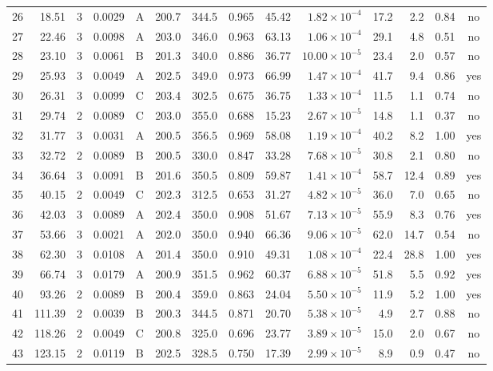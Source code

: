 \begin{landscape}
\begin{longtable}{rrrrlrrrrrrrrc}
26 & 18.51 & 3 & 0.0029 & A & 200.7 & 344.5 & 0.965 & 45.42 & $1.82\times10^{-4}$ & 17.2 & 2.2 & 0.84 & no \\
27 & 22.46 & 3 & 0.0098 & A & 203.0 & 346.0 & 0.963 & 63.13 & $1.06\times10^{-4}$ & 29.1 & 4.8 & 0.51 & no \\
28 & 23.10 & 3 & 0.0061 & B & 201.3 & 340.0 & 0.886 & 36.77 & $10.00\times10^{-5}$ & 23.4 & 2.0 & 0.57 & no \\
29 & 25.93 & 3 & 0.0049 & A & 202.5 & 349.0 & 0.973 & 66.99 & $1.47\times10^{-4}$ & 41.7 & 9.4 & 0.86 & yes \\
30 & 26.31 & 3 & 0.0099 & C & 203.4 & 302.5 & 0.675 & 36.75 & $1.33\times10^{-4}$ & 11.5 & 1.1 & 0.74 & no \\
31 & 29.74 & 2 & 0.0089 & C & 203.0 & 355.0 & 0.688 & 15.23 & $2.67\times10^{-5}$ & 14.8 & 1.1 & 0.37 & no \\
32 & 31.77 & 3 & 0.0031 & A & 200.5 & 356.5 & 0.969 & 58.08 & $1.19\times10^{-4}$ & 40.2 & 8.2 & 1.00 & yes \\
33 & 32.72 & 2 & 0.0089 & B & 200.5 & 330.0 & 0.847 & 33.28 & $7.68\times10^{-5}$ & 30.8 & 2.1 & 0.80 & no \\
34 & 36.64 & 3 & 0.0091 & B & 201.6 & 350.5 & 0.809 & 59.87 & $1.41\times10^{-4}$ & 58.7 & 12.4 & 0.89 & yes \\
35 & 40.15 & 2 & 0.0049 & C & 202.3 & 312.5 & 0.653 & 31.27 & $4.82\times10^{-5}$ & 36.0 & 7.0 & 0.65 & no \\
36 & 42.03 & 3 & 0.0089 & A & 202.4 & 350.0 & 0.908 & 51.67 & $7.13\times10^{-5}$ & 55.9 & 8.3 & 0.76 & yes \\
37 & 53.66 & 3 & 0.0021 & A & 202.0 & 350.0 & 0.940 & 66.36 & $9.06\times10^{-5}$ & 62.0 & 14.7 & 0.54 & no \\
38 & 62.30 & 3 & 0.0108 & A & 201.4 & 350.0 & 0.910 & 49.31 & $1.08\times10^{-4}$ & 22.4 & 28.8 & 1.00 & yes \\
39 & 66.74 & 3 & 0.0179 & A & 200.9 & 351.5 & 0.962 & 60.37 & $6.88\times10^{-5}$ & 51.8 & 5.5 & 0.92 & yes \\
40 & 93.26 & 2 & 0.0089 & B & 200.4 & 359.0 & 0.863 & 24.04 & $5.50\times10^{-5}$ & 11.9 & 5.2 & 1.00 & yes \\
41 & 111.39 & 2 & 0.0039 & B & 200.3 & 344.5 & 0.871 & 20.70 & $5.38\times10^{-5}$ & 4.9 & 2.7 & 0.88 & no \\
42 & 118.26 & 2 & 0.0049 & C & 200.8 & 325.0 & 0.696 & 23.77 & $3.89\times10^{-5}$ & 15.0 & 2.0 & 0.67 & no \\
43 & 123.15 & 2 & 0.0119 & B & 202.5 & 328.5 & 0.750 & 17.39 & $2.99\times10^{-5}$ & 8.9 & 0.9 & 0.47 & no \\

\end{longtable}
\end{landscape}
